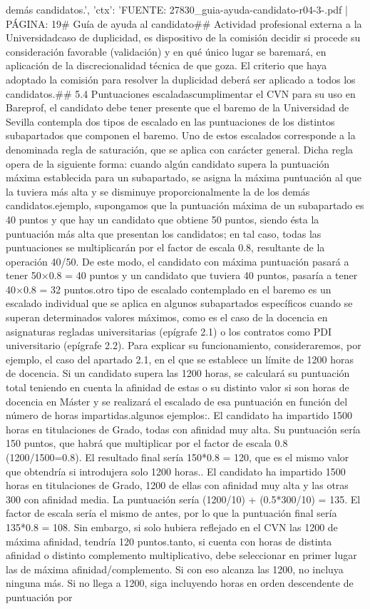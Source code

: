 \documentclass{article}
\begin{document}
\begin{itemize}
{{{demás candidatos.', 'ctx': 'FUENTE: 27830_guia-ayuda-candidato-r04-3-.pdf | PÁGINA: 19\n# Guía de ayuda al candidato\n\n## Actividad profesional externa a la Universidad\n\nEn caso de duplicidad, es dispositivo de la comisión decidir si procede su consideración favorable (validación) y en qué único lugar se baremará, en aplicación de la discrecionalidad técnica de que goza. El criterio que haya adoptado la comisión para resolver la duplicidad deberá ser aplicado a todos los candidatos.\n\n## 5.4 Puntuaciones escaladas\n\nAl cumplimentar el CVN para su uso en Bareprof, el candidato debe tener presente que el baremo de la Universidad de Sevilla contempla dos tipos de escalado en las puntuaciones de los distintos subapartados que componen el baremo. Uno de estos escalados corresponde a la denominada regla de saturación, que se aplica con carácter general. Dicha regla opera de la siguiente forma: cuando algún candidato supera la puntuación máxima establecida para un subapartado, se asigna la máxima puntuación al que la tuviera más alta y se disminuye proporcionalmente la de los demás candidatos.\n\nPor ejemplo, supongamos que la puntuación máxima de un subapartado es 40 puntos y que hay un candidato que obtiene 50 puntos, siendo ésta la puntuación más alta que presentan los candidatos; en tal caso, todas las puntuaciones se multiplicarán por el factor de escala 0.8, resultante de la operación 40/50. De este modo, el candidato con máxima puntuación pasará a tener 50×0.8 = 40 puntos y un candidato que tuviera 40 puntos, pasaría a tener 40×0.8 = 32 puntos.\n\nEl otro tipo de escalado contemplado en el baremo es un escalado individual que se aplica en algunos subapartados específicos cuando se superan determinados valores máximos, como es el caso de la docencia en asignaturas regladas universitarias (epígrafe 2.1) o los contratos como PDI universitario (epígrafe 2.2). Para explicar su funcionamiento, consideraremos, por ejemplo, el caso del apartado 2.1, en el que se establece un límite de 1200 horas de docencia. Si un candidato supera las 1200 horas, se calculará su puntuación total teniendo en cuenta la afinidad de estas o su distinto valor si son horas de docencia en Máster y se realizará el escalado de esa puntuación en función del número de horas impartidas.\n\nVeamos algunos ejemplos:\n{}. El candidato ha impartido 1500 horas en titulaciones de Grado, todas con afinidad muy alta. Su puntuación sería 150 puntos, que habrá que multiplicar por el factor de escala 0.8 (1200/1500=0.8). El resultado final sería 150*0.8 = 120, que es el mismo valor que obtendría si introdujera solo 1200 horas.. El candidato ha impartido 1500 horas en titulaciones de Grado, 1200 de ellas con afinidad muy alta y las otras 300 con afinidad media. La puntuación sería (1200/10) + (0.5*300/10) = 135. El factor de escala sería el mismo de antes, por lo que la puntuación final sería 135*0.8 = 108. Sin embargo, si solo hubiera reflejado en el CVN las 1200 de máxima afinidad, tendría 120 puntos.\n\nPor tanto, si cuenta con horas de distinta afinidad o distinto complemento multiplicativo, debe seleccionar en primer lugar las de máxima afinidad/complemento. Si con eso alcanza las 1200, no incluya ninguna más. Si no llega a 1200, siga incluyendo horas en orden descendente de puntuación por }}}
\end{itemize}
\end{document}
